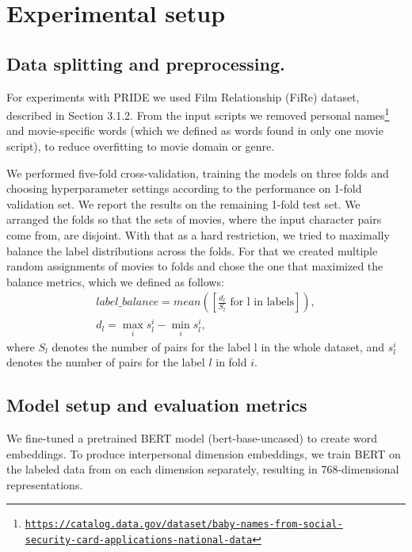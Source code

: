 \section{Experimental setup}

\subsection{Data splitting and preprocessing.} 
For experiments with PRIDE we used Film Relationship (FiRe) dataset, described in Section 3.1.2.
From the input scripts we removed personal names\footnote{
\href{https://catalog.data.gov/dataset/baby-names-from-social-security-card-applications-national-data}{\texttt{\justify https://catalog.data.gov/dataset/baby-names-from-social-\\security-card-applications-national-data}}} and movie-specific words (which we defined as words found in only one movie script), to reduce overfitting to movie domain or genre.

We performed five-fold cross-validation, training the models on three folds and choosing hyperparameter settings according to the performance on 1-fold validation set. We report the results on the remaining 1-fold test set. We arranged the folds so that the sets of movies, where the input character pairs come from, are disjoint. With that as a hard restriction, we tried to maximally balance the label distributions across the folds. For that we created multiple random assignments of movies to folds and chose the one that maximized the balance metrics, which we defined as follows:
\begin{gather*}
    label\_balance = mean([\frac{d_l}{S_l} \mbox{ for l in labels}]), \\
    d_l = \max_{i}s^i_l - \min_{i}s^i_l, 
\end{gather*}
where $S_l$ denotes the number of pairs for the label l in the whole dataset, and $s^i_l$ denotes the number of pairs for the label $l$ in fold $i$.


\subsection{Model setup and evaluation metrics}

We fine-tuned a pretrained BERT model (bert-base-uncased) to create word embeddings. To produce interpersonal dimension embeddings, we train BERT on the labeled data from \citet{rashid2018characterizing} on each dimension separately, resulting in 768-dimensional representations.

